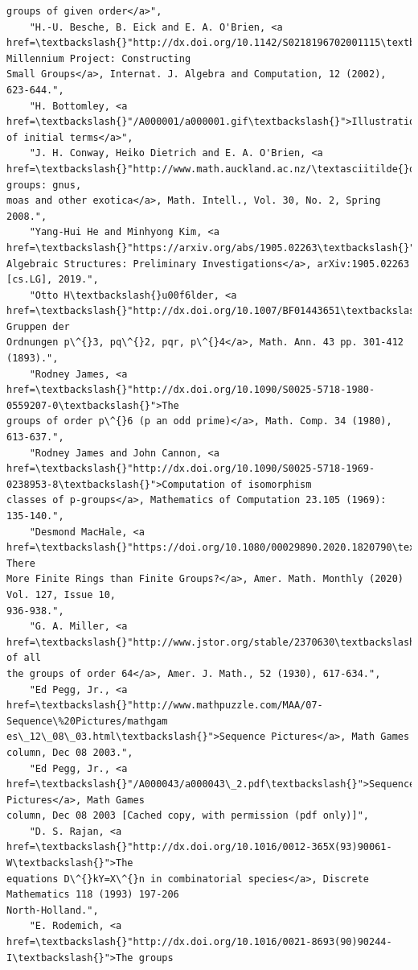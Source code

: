 \documentclass[11pt]{article}
\begin{document}
\begin{Verbatim}[commandchars=\\\{\}]
groups of given order</a>",
    "H.-U. Besche, B. Eick and E. A. O'Brien, <a
href=\textbackslash{}"http://dx.doi.org/10.1142/S0218196702001115\textbackslash{}">A Millennium Project: Constructing
Small Groups</a>, Internat. J. Algebra and Computation, 12 (2002), 623-644.",
    "H. Bottomley, <a href=\textbackslash{}"/A000001/a000001.gif\textbackslash{}">Illustration of initial terms</a>",
    "J. H. Conway, Heiko Dietrich and E. A. O'Brien, <a
href=\textbackslash{}"http://www.math.auckland.ac.nz/\textasciitilde{}obrien/research/gnu.pdf\textbackslash{}">Counting groups: gnus,
moas and other exotica</a>, Math. Intell., Vol. 30, No. 2, Spring 2008.",
    "Yang-Hui He and Minhyong Kim, <a href=\textbackslash{}"https://arxiv.org/abs/1905.02263\textbackslash{}">Learning
Algebraic Structures: Preliminary Investigations</a>, arXiv:1905.02263 [cs.LG], 2019.",
    "Otto H\textbackslash{}u00f6lder, <a href=\textbackslash{}"http://dx.doi.org/10.1007/BF01443651\textbackslash{}">Die Gruppen der
Ordnungen p\^{}3, pq\^{}2, pqr, p\^{}4</a>, Math. Ann. 43 pp. 301-412 (1893).",
    "Rodney James, <a href=\textbackslash{}"http://dx.doi.org/10.1090/S0025-5718-1980-0559207-0\textbackslash{}">The
groups of order p\^{}6 (p an odd prime)</a>, Math. Comp. 34 (1980), 613-637.",
    "Rodney James and John Cannon, <a
href=\textbackslash{}"http://dx.doi.org/10.1090/S0025-5718-1969-0238953-8\textbackslash{}">Computation of isomorphism
classes of p-groups</a>, Mathematics of Computation 23.105 (1969): 135-140.",
    "Desmond MacHale, <a href=\textbackslash{}"https://doi.org/10.1080/00029890.2020.1820790\textbackslash{}">Are There
More Finite Rings than Finite Groups?</a>, Amer. Math. Monthly (2020) Vol. 127, Issue 10,
936-938.",
    "G. A. Miller, <a href=\textbackslash{}"http://www.jstor.org/stable/2370630\textbackslash{}">Determination of all
the groups of order 64</a>, Amer. J. Math., 52 (1930), 617-634.",
    "Ed Pegg, Jr., <a href=\textbackslash{}"http://www.mathpuzzle.com/MAA/07-Sequence\%20Pictures/mathgam
es\_12\_08\_03.html\textbackslash{}">Sequence Pictures</a>, Math Games column, Dec 08 2003.",
    "Ed Pegg, Jr., <a href=\textbackslash{}"/A000043/a000043\_2.pdf\textbackslash{}">Sequence Pictures</a>, Math Games
column, Dec 08 2003 [Cached copy, with permission (pdf only)]",
    "D. S. Rajan, <a href=\textbackslash{}"http://dx.doi.org/10.1016/0012-365X(93)90061-W\textbackslash{}">The
equations D\^{}kY=X\^{}n in combinatorial species</a>, Discrete Mathematics 118 (1993) 197-206
North-Holland.",
    "E. Rodemich, <a href=\textbackslash{}"http://dx.doi.org/10.1016/0021-8693(90)90244-I\textbackslash{}">The groups

\end{Verbatim}
\end{document}
